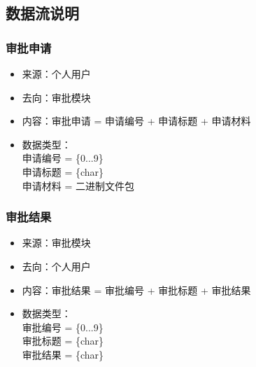         \subsection{\color{red} 数据流说明}
            
            \subsubsection{\color{red} 审批申请}
            \begin{itemize}
                \item 来源：个人用户
                \item 去向：审批模块
                \item 内容：审批申请 = 申请编号 + 申请标题 + 申请材料
                \item 数据类型：\\
                    申请编号 = \{0...9\}\\
                    申请标题 = \{char\}\\
                    申请材料 = 二进制文件包\\
            \end{itemize}
            \subsubsection{\color{red} 审批结果}
            \begin{itemize}
                \item 来源：审批模块
                \item 去向：个人用户
                \item 内容：审批结果 = 审批编号 + 审批标题 + 审批结果
                \item 数据类型：\\
                    审批编号 = \{0...9\}\\
                    审批标题 = \{char\}\\
                    审批结果 = \{char\}\\
            \end{itemize}

